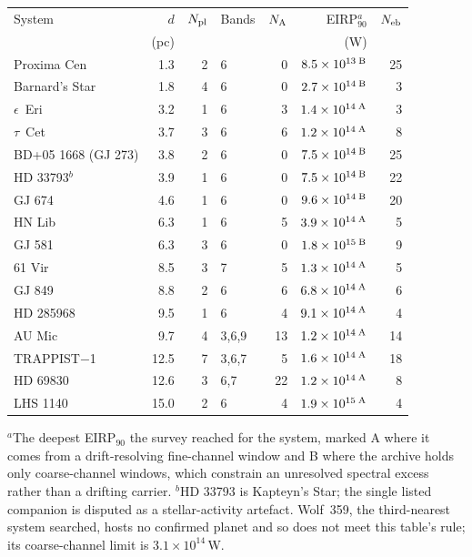 \begin{tabular}{@{}l@{~~}r@{~~}r@{~~}l@{~~}r@{~~}r@{~~}r@{}}
\hline
System & $d$ & $N_{\rm pl}$ & Bands & $N_{\rm A}$ & EIRP$_{90}^{a}$ & $N_{\rm eb}$ \\
 & (pc) & & & & (W) & \\
\hline
Proxima Cen & 1.3 & 2 & 6 & 0 & $8.5\times10^{13}\,^{\rm B}$ & 25 \\
Barnard's Star & 1.8 & 4 & 6 & 0 & $2.7\times10^{14}\,^{\rm B}$ & 3 \\
$\epsilon$~Eri & 3.2 & 1 & 6 & 3 & $1.4\times10^{14}\,^{\rm A}$ & 3 \\
$\tau$~Cet & 3.7 & 3 & 6 & 6 & $1.2\times10^{14}\,^{\rm A}$ & 8 \\
BD+05 1668 (GJ 273) & 3.8 & 2 & 6 & 0 & $7.5\times10^{14}\,^{\rm B}$ & 25 \\
HD 33793$^{b}$ & 3.9 & 1 & 6 & 0 & $7.5\times10^{14}\,^{\rm B}$ & 22 \\
GJ 674 & 4.6 & 1 & 6 & 0 & $9.6\times10^{14}\,^{\rm B}$ & 20 \\
HN Lib & 6.3 & 1 & 6 & 5 & $3.9\times10^{14}\,^{\rm A}$ & 5 \\
GJ 581 & 6.3 & 3 & 6 & 0 & $1.8\times10^{15}\,^{\rm B}$ & 9 \\
61 Vir & 8.5 & 3 & 7 & 5 & $1.3\times10^{14}\,^{\rm A}$ & 5 \\
GJ 849 & 8.8 & 2 & 6 & 6 & $6.8\times10^{14}\,^{\rm A}$ & 6 \\
HD 285968 & 9.5 & 1 & 6 & 4 & $9.1\times10^{14}\,^{\rm A}$ & 4 \\
AU Mic & 9.7 & 4 & 3,6,9 & 13 & $1.2\times10^{14}\,^{\rm A}$ & 14 \\
TRAPPIST$-$1 & 12.5 & 7 & 3,6,7 & 5 & $1.6\times10^{14}\,^{\rm A}$ & 18 \\
HD 69830 & 12.6 & 3 & 6,7 & 22 & $1.2\times10^{14}\,^{\rm A}$ & 8 \\
LHS 1140 & 15.0 & 2 & 6 & 4 & $1.9\times10^{15}\,^{\rm A}$ & 4 \\
\hline
\end{tabular}

{\footnotesize $^{a}$The deepest EIRP$_{90}$ the survey reached for the system, marked A where it comes from a drift-resolving fine-channel window and B where the archive holds only coarse-channel windows, which constrain an unresolved spectral excess rather than a drifting carrier. $^{b}$HD 33793 is Kapteyn's Star; the single listed companion is disputed as a stellar-activity artefact. Wolf~359, the third-nearest system searched, hosts no confirmed planet and so does not meet this table's rule; its coarse-channel limit is $3.1\times10^{14}$\,W.}
